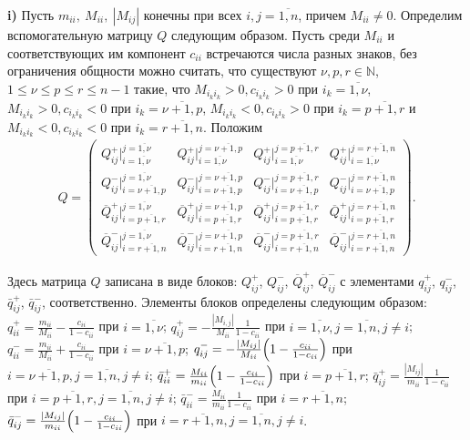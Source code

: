 \textbf{i)} Пусть $m_{ii},\: M_{ii},\:|M_{ij}|$ конечны при всех $i,j=\overline{1,n}$, причем ${M_{ii}\neq 0}$.
Определим вспомогательную матрицу $Q$ следующим образом. Пусть среди $M_{ii}$ и соответствующих им компонент $c_{ii}$ встречаются числа разных знаков, без ограничения общности можно считать, что существуют $\nu, p, r\in \mathbb{N}$,  $1\leq \nu\leq p\leq r\leq n-1$ такие, что $M_{i_ki_k}>0, c_{i_ki_k}>0$ при $i_k=\overline{1,\nu}$, $M_{i_ki_k}>0, c_{i_ki_k}<0$ при $i_k=\overline{\nu+1,p}$, $M_{i_ki_k}<0, c_{i_ki_k}>0$ при $i_k=\overline{p+1,r}$  и $M_{i_ki_k}<0, c_{i_ki_k}<0$ при $i_k=\overline{r+1,n}$.
Положим
\begin{multline*}
Q=
\begin{pmatrix}
Q^+_{ij}\bigr|_{i=\overline{1,\nu}}^{j=\overline{1,\nu}}& Q^+_{ij}\bigr|_{i=\overline{1,\nu}}^{j=\overline{\nu+1,p}}&
Q^+_{ij}\bigr|_{i=\overline{1,\nu}}^{j=\overline{p+1,r}}& Q^+_{ij}\bigr|_{i=\overline{1,\nu}}^{j=\overline{r+1,n}}\\
Q^-_{ij}\bigr|_{i=\overline{\nu+1,p}}^{j=\overline{1,\nu}}&
Q^-_{ij}\bigr|_{i=\overline{\nu+1,p}}^{j=\overline{\nu+1,p}}&
Q^-_{ij}\bigr|_{i=\overline{\nu+1,p}}^{j=\overline{p+1,r}}&
Q^-_{ij}\bigr|_{i=\overline{\nu+1,p}}^{j=\overline{r+1,n}}\\
\overline{Q}^+_{ij}\bigr|_{i=\overline{p+1,r}}^{j=\overline{1,\nu}}&
\overline{Q}^+_{ij}\bigr|_{i=\overline{p+1,r}}^{j=\overline{\nu+1,p}}&
\overline{Q}^+_{ij}\bigr|_{i=\overline{p+1,r}}^{j=\overline{p+1,r}}&
\overline{Q}^+_{ij}\bigr|_{i=\overline{p+1,r}}^{j=\overline{r+1,n}}\\
\overline{Q}^-_{ij}\bigr|_{i=\overline{r+1,n}}^{j=\overline{1,\nu}}&
\overline{Q}^-_{ij}\bigr|_{i=\overline{r+1,n}}^{j=\overline{\nu+1,p}}&
\overline{Q}^-_{ij}\bigr|_{i=\overline{r+1,n}}^{j=\overline{p+1,r}}&
\overline{Q}^-_{ij}\bigr|_{i=\overline{r+1,n}}^{j=\overline{r+1,n}}
\end{pmatrix}.
\end{multline*}


Здесь матрица $Q$ записана в виде блоков:  $Q^+_{ij}$, $Q^-_{ij}$, $\overline{Q}^+_{ij}$, $\overline{Q}^-_{ij}$ с элементами $q^+_{ij}$, $q^-_{ij}$, $\bar{q}^+_{ij}$, $\bar{q}^-_{ij}$, соответственно. Элементы блоков определены следующим образом: $q^+_{ii}=\frac{m_{ii}}{M_{ii}}-\frac{c_{ii}}{1-c_{ii}}$ при $i=\overline{1, \nu}$; $q^+_{ij}=-\frac{|M_{i,j}|}{M_{ii}} \frac{1}{1-c_{ii}}$ при $i=\overline{1, \nu}, j=\overline{1, n}, j\neq i$; $q^-_{ii}=\frac{m_{ii}}{M_{ii}}+\frac{c_{ii}}{1-c_{ii}}$ при $i=\overline{\nu+1, p}$; $q^-_{ij}=-\frac{|M_{ij}|}{M_{ii}} \Bigl(1-\frac{c_{ii}}{1-c_{ii}}\Bigr)$ при $i=\overline{\nu+1, p}, j=\overline{1,n}, j\neq i$; $\bar{q}^+_{ii}=\frac{M_{ii}}{m_{ii}}\Bigl(1-\frac{c_{ii}}{1-c_{ii}}\Bigr)$  при $i=\overline{p+1, r}$; $\bar{q}^+_{ij}=\frac{|M_{ij}|}{m_{ii}}\frac{1}{1-c_{ii}}$ при $i=\overline{p+1, r}, j=\overline{1,n}, j\neq i$; $\bar{q}^-_{ii}=\frac{M_{ii}}{m_{ii}}\frac{1}{1-c_{ii}}$ при $i=\overline{r+1, n}$; $\bar{q}^-_{ij}= \frac{|M_{ij}|}{m_{ii}}\Bigl(1-\frac{c_{ii}}{1-c_{ii}}\Bigr)$ при $i=\overline{r+1, n}, j=\overline{1,n},  j\neq i$.


